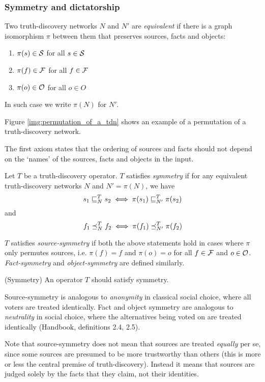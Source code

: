\documentclass[../main.tex]{subfiles}
\begin{document}
\subsubsection{Symmetry and dictatorship}

\begin{definition}
Two truth-discovery networks $N$ and $N'$ are \emph{equivalent} if there is a
graph isomorphism $\pi$ between them that preserves sources, facts and objects:
\begin{enumerate}
\item $\pi(s) \in \S$ for all $s \in \S$
\item $\pi(f) \in \F$ for all $f \in \F$
\item $\pi(o) \in \O$ for all $o \in O$
\end{enumerate}

In such case we write $\pi(N)$ for $N'$.
\end{definition}

Figure \ref{img:permutation_of_a_tdn} shows an example of a permutation of a
truth-discovery network.

The first axiom states that the ordering of sources and facts should not depend
on the `names' of the sources, facts and objects in the input.

\begin{definition}
Let $T$ be a truth-discovery operator. $T$ satisfies \emph{symmetry} if for
any equivalent truth-discovery networks $N$ and $N' = \pi(N)$, we have
$$ s_1 \sle_N^T s_2 \iff \pi(s_1) \sle_{N'}^T \pi(s_2) $$
and
$$ f_1 \fle_N^T f_2 \iff \pi(f_1) \fle_{N'}^T \pi(f_2) $$

$T$ satisfies \emph{source-symmetry} if both the above statements hold in cases
where $\pi$ only permutes sources, i.e. $\pi(f)=f$ and $\pi(o)=o$ for all $f
\in \F$ and $o \in \O$. \emph{Fact-symmetry} and \emph{object-symmetry} are
defined similarly.
\end{definition}

\begin{axiom}(Symmetry)
\label{axiom:symm}
An operator $T$ should satisfy symmetry.
\end{axiom}

\begin{remark}
Source-symmetry is analogous to \emph{anonymity} in classical social choice,
where all voters are treated identically. Fact and object symmetry are
analogous to \emph{neutrality} in social choice, where the alternatives being
voted on are treated identically (Handbook, definitions 2.4, 2.5).

Note that source-symmetry does not mean that sources are treated \emph{equally}
per se, since some sources are presumed to be more trustworthy than others
(this is more or less the central premise of truth-discovery). Instead it means
that sources are judged solely by the facts that they claim, not their
identities.

\end{remark}
\end{document}
